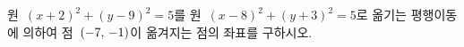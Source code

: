 원~$(x+2)^2+(y-9)^2=5$를 원~$(x-8)^2+(y+3)^2=5$로 옮기는 평행이동에 의하여 점~$(-7,\mkern3mu -1)$이 옮겨지는 점의 좌표를 구하시오.

